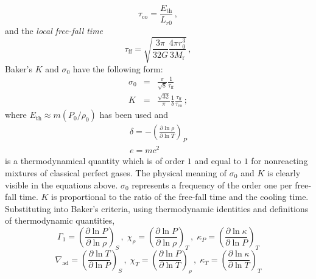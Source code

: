 \documentclass{aa}
\begin{document}
   \begin{equation}
    \label{eq1}
      \tau_{\mathrm{co}} = \frac{E_{\mathrm{th}}}{L_{r0}} \,,
   \end{equation}
   and the \emph{local free-fall time}
   \begin{equation}
      \tau_{\mathrm{ff}} =
         \sqrt{ \frac{3 \pi}{32 G} \frac{4\pi r_0^3}{3 M_{\mathrm{r}}}
}\,,
   \end{equation}
   Baker's $K$ and $\sigma_0$ have the following form:
   \begin{eqnarray}
   \label{eq3}
      \sigma_0 & = & \frac{\pi}{\sqrt{8}}
                     \frac{1}{ \tau_{\mathrm{ff}}} \\
      K        & = & \frac{\sqrt{32}}{\pi} \frac{1}{\delta}
                        \frac{ \tau_{\mathrm{ff}} }
                             { \tau_{\mathrm{co}} }\,;
   \end{eqnarray}
   where $ E_{\mathrm{th}} \approx m (P_0/{\rho_0})$ has been used and
   \begin{equation}
   \begin{array}{l}
      \delta = - \left(
                    \frac{ \partial \ln \rho }{ \partial \ln T }
                 \right)_P \\
      e=mc^2
   \end{array}
   \end{equation}
   is a thermodynamical quantity which is of order $1$ and equal to $1$
   for nonreacting mixtures of classical perfect gases. The physical
   meaning of $ \sigma_0 $ and $K$ is clearly visible in the equations
   above. $\sigma_0$ represents a frequency of the order one per
   free-fall time. $K$ is proportional to the ratio of the free-fall
   time and the cooling time. Substituting into Baker's criteria, using
   thermodynamic identities and definitions of thermodynamic quantities,
   \begin{displaymath}
      \Gamma_1      = \left( \frac{ \partial \ln P}{ \partial\ln \rho}
                           \right)_{S}    \, , \;
      \chi^{}_\rho  = \left( \frac{ \partial \ln P}{ \partial\ln \rho}
                           \right)_{T}    \, , \;
      \kappa^{}_{P} = \left( \frac{ \partial \ln \kappa}{ \partial\ln P}
                           \right)_{T}
   \end{displaymath}
   \begin{displaymath}
      \nabla_{\mathrm{ad}} = \left( \frac{ \partial \ln T}
                             { \partial\ln P} \right)_{S} \, , \;
      \chi^{}_T       = \left( \frac{ \partial \ln P}
                             { \partial\ln T} \right)_{\rho} \, , \;
      \kappa^{}_{T}   = \left( \frac{ \partial \ln \kappa}
                             { \partial\ln T} \right)_{T}
   \end{displaymath}
\end{document}
